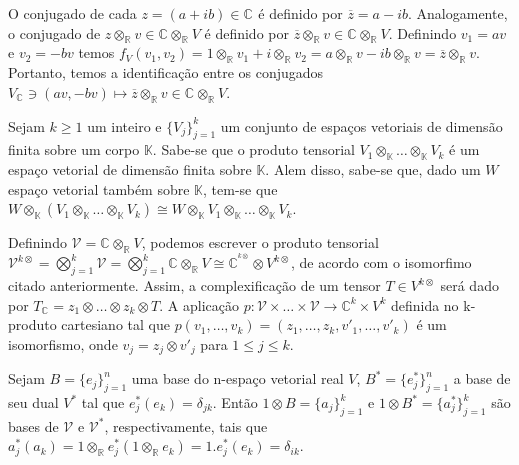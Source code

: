 \documentclass[12pt]{book}
\newcommand{\complexificacao}[1]{#1_{\complexo{}}}
\newcommand{\complexificacaotensorial}[1]{\complexo{}\otimes_{\reta} #1}
\newcommand{\complexificacaotensorialabrev}[1]{\mathcal{V}}
\newcommand{\complexificacaoelemento}[2]{#1\otimes_{\reta} #2}
\newcommand{\complexo}[1]{\mathbb{C}^{#1}}
\newcommand{\produtotensorial}[2]{ #1_{1} \otimes_{\mathbb{K}} \dots \otimes_{\mathbb{K}} #1_{#2}}
\newcommand{\real}[1]{\mathbb{R}^{#1}}
\newcommand{\reta}{\real{}}
\begin{document}
	O conjugado de cada $z=(a+ib) \in \complexo{}$ é definido por $\overline{z} = a-ib$. Analogamente, o conjugado de $\complexificacaoelemento{z}{v} \in \complexificacaotensorial{V}$ é definido por $\complexificacaoelemento{\overline{z}}{v} \in \complexificacaotensorial{V}$. Definindo $v_{1} =av$ e $v_{2} = -bv$ temos $f_{V}(v_{1}, v_{2}) =\complexificacaoelemento{1}{v_{1}} +\complexificacaoelemento{i}{v_{2}} = \complexificacaoelemento{a}{v} -\complexificacaoelemento{ib}{v}  =\complexificacaoelemento{\overline{z}}{v}  $. Portanto, temos a identificação entre os conjugados $ \complexificacao{V} \ni (av, -bv) \mapsto \complexificacaoelemento{\overline{z}}{v} \in \complexificacaotensorial{V}$.
	
	Sejam $k\geq 1$ um inteiro e $\{V_{j}\}_{j=1}^{k}$ um conjunto de espaços vetoriais de dimensão finita sobre um corpo $\mathbb{K}$. Sabe-se que o produto tensorial $\produtotensorial{V}{k}$ é um espaço vetorial de dimensão finita sobre $\mathbb{K}$. Alem disso, sabe-se que, dado um $W$ espaço vetorial também sobre $\mathbb{K}$, tem-se que $W\otimes_{\mathbb{K}}(\produtotensorial{V}{k}) \cong W\otimes_{\mathbb{K}} \produtotensorial{V}{k}$. 
	
	Definindo $\complexificacaotensorialabrev{V} = \complexificacaotensorial{V}$, podemos escrever o produto tensorial $\complexificacaotensorialabrev{V}^{k\otimes} = \bigotimes_{j=1}^{k}\complexificacaotensorialabrev{V} =\bigotimes_{j=1}^{k}\complexificacaotensorial{V} \cong  \complexo{^{k\otimes}}\otimes V^{k\otimes}$, de acordo com o isomorfimo citado anteriormente. Assim, a complexificação de um tensor $T \in V^{k\otimes} $ será dado por $\complexificacao{T} = z_{1}\otimes \dots \otimes z_{k}\otimes T$. A aplicação $p: \complexificacaotensorialabrev{V}\times \dots \times  \complexificacaotensorialabrev{V} \to \complexo{k}\times V^{k}$ definida no k-produto cartesiano tal que $p(v_{1}, \dots, v_{k}) = (z_{1}, \dots, z_{k},v'_{1}, \dots, v'_{k})$ é um isomorfismo, onde $v_{j} = z_{j}\otimes v'_{j}$ para $1\leq j \leq k$.
	
	Sejam $B = \{e_{j}\}_{j=1}^{n}$ uma base do n-espaço vetorial real $V$, $B^{*} = \{e_{j}^{*}\}_{j=1}^{n}$ a base de seu dual $V^{*}$ tal que $e^{*}_{j}(e_{k}) =\delta_{jk}$. Então $1\otimes B = \{a_{j}\}_{j=1}^{k}$ e $1\otimes B^{*}=\{a^{*}_{j}\}_{j=1}^{k}$ são bases de $\complexificacaotensorialabrev{V}$ e $\complexificacaotensorialabrev{V}^{*}$, respectivamente, tais que $a^{*}_{j}(a_{k})=\complexificacaoelemento{1}{e^{*}_{j}}(\complexificacaoelemento{1}{e_{k}}) = 1.e^{*}_{j}(e_{k}) = \delta_{ik}$.
	
\end{document}
